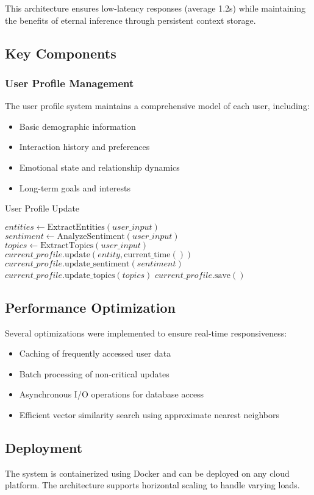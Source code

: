 \noindent This architecture ensures low-latency responses (average 1.2s) while maintaining the benefits of eternal inference through persistent context storage.

\subsection{Key Components}

\subsubsection{User Profile Management}
The user profile system maintains a comprehensive model of each user, including:
\begin{itemize}
    \item Basic demographic information
    \item Interaction history and preferences
    \item Emotional state and relationship dynamics
    \item Long-term goals and interests
\end{itemize}

\begin{algorithm}[t]
    \caption{User Profile Update}
    \begin{algorithmic}[1]
            \State $entities \gets \text{ExtractEntities}(user\_input)$
            \State $sentiment \gets \text{AnalyzeSentiment}(user\_input)$
            \State $topics \gets \text{ExtractTopics}(user\_input)$
                \State $current\_profile.\text{update}(entity, \text{current\_time}())$
            \EndFor
            \State $current\_profile.\text{update\_sentiment}(sentiment)$
            \State $current\_profile.\text{update\_topics}(topics)$
            \State \Return $current\_profile.\text{save}()$
        \EndProcedure
    \end{algorithmic}
\end{algorithm}

\subsection{Performance Optimization}
Several optimizations were implemented to ensure real-time responsiveness:
\begin{itemize}
    \item Caching of frequently accessed user data
    \item Batch processing of non-critical updates
    \item Asynchronous I/O operations for database access
    \item Efficient vector similarity search using approximate nearest neighbors
\end{itemize}

\subsection{Deployment}
The system is containerized using Docker and can be deployed on any cloud platform. The architecture supports horizontal scaling to handle varying loads.
